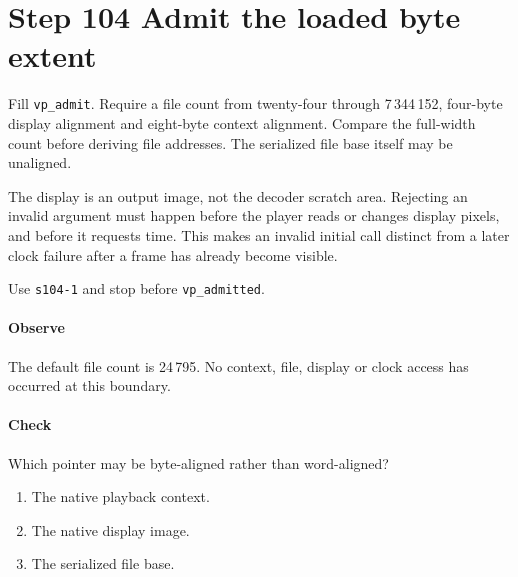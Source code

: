 \section{Step 104 Admit the loaded byte extent}
Fill \texttt{vp\_admit}. Require a file count from twenty-four through 7\,344\,152, four-byte display alignment and eight-byte context alignment. Compare the full-width count before deriving file addresses. The serialized file base itself may be unaligned.

The display is an output image, not the decoder scratch area. Rejecting an invalid argument must happen before the player reads or changes display pixels, and before it requests time. This makes an invalid initial call distinct from a later clock failure after a frame has already become visible.

Use \texttt{s104-1} and stop before \texttt{vp\_admitted}.

\paragraph{Observe} The default file count is 24\,795. No context, file, display or clock access has occurred at this boundary.

\paragraph{Check} Which pointer may be byte-aligned rather than word-aligned?
\begin{enumerate}[label=\Alph*.]
  \item The native playback context.
  \item The native display image.
  \item The serialized file base.
\end{enumerate}
